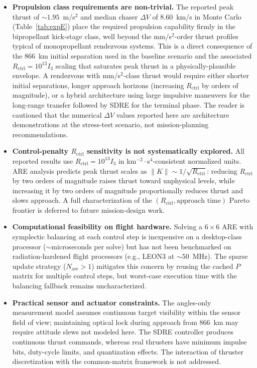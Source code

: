 \documentclass[preprint,3p,times]{elsarticle}
\begin{document}
\begin{itemize}
    \item \textbf{Propulsion class requirements are non-trivial.} The reported peak thrust of ${\sim}1.95$~m/s$^2$ and median chaser $\Delta V$ of 8.60~km/s in Monte Carlo (Table~\ref{tab:expE}) place the required propulsion capability firmly in the bipropellant kick-stage class, well beyond the mm/s$^2$-order thrust profiles typical of monopropellant rendezvous systems. This is a direct consequence of the 866~km initial separation used in the baseline scenario and the associated $R_{\text{ctrl}} = 10^{13} I_3$ scaling that saturates peak thrust in a physically-plausible envelope. A rendezvous with mm/s$^2$-class thrust would require either shorter initial separations, longer approach horizons (increasing $R_{\text{ctrl}}$ by orders of magnitude), or a hybrid architecture using large impulsive maneuvers for the long-range transfer followed by SDRE for the terminal phase. The reader is cautioned that the numerical $\Delta V$ values reported here are architecture demonstrations at the stress-test scenario, not mission-planning recommendations.

    \item \textbf{Control-penalty $R_{\text{ctrl}}$ sensitivity is not systematically explored.} All reported results use $R_{\text{ctrl}} = 10^{13} I_3$ in km$^{-2} \cdot$s$^4$-consistent normalized units. ARE analysis predicts peak thrust scales as $\|K\| \sim 1/\sqrt{R_{\text{ctrl}}}$: reducing $R_{\text{ctrl}}$ by two orders of magnitude raises thrust toward unphysical levels, while increasing it by two orders of magnitude proportionally reduces thrust and slows approach. A full characterization of the $(R_{\text{ctrl}}, \text{approach time})$ Pareto frontier is deferred to future mission-design work.

    \item \textbf{Computational feasibility on flight hardware.} Solving a $6 \times 6$ ARE with symplectic balancing at each control step is inexpensive on a desktop-class processor (${\sim}$microseconds per solve) but has not been benchmarked on radiation-hardened flight processors (e.g., LEON3 at ${\sim}50$~MHz). The sparse update strategy ($N_{\text{are}} > 1$) mitigates this concern by reusing the cached $P$ matrix for multiple control steps, but worst-case execution time with the balancing fallback remains uncharacterized.

    \item \textbf{Practical sensor and actuator constraints.} The angles-only measurement model assumes continuous target visibility within the sensor field of view; maintaining optical lock during approach from 866~km may require attitude slews not modeled here. The SDRE controller produces continuous thrust commands, whereas real thrusters have minimum impulse bits, duty-cycle limits, and quantization effects. The interaction of thruster discretization with the common-matrix framework is not addressed.
\end{itemize}
\end{document}
